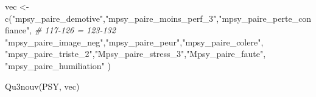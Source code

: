\documentclass[
]{article}
\newenvironment{Shaded}{\begin{snugshade}}{\end{snugshade}}
\newcommand{\CommentTok}[1]{\textcolor[rgb]{0.56,0.35,0.01}{\textit{#1}}}
\newcommand{\FunctionTok}[1]{\textcolor[rgb]{0.00,0.00,0.00}{#1}}
\newcommand{\NormalTok}[1]{#1}
\newcommand{\OtherTok}[1]{\textcolor[rgb]{0.56,0.35,0.01}{#1}}
\newcommand{\StringTok}[1]{\textcolor[rgb]{0.31,0.60,0.02}{#1}}
\begin{document}
\begin{Shaded}
\begin{Highlighting}[]
\NormalTok{vec }\OtherTok{\textless{}{-}} \FunctionTok{c}\NormalTok{(}\StringTok{"mpsy\_paire\_demotive"}\NormalTok{,}\StringTok{"mpsy\_paire\_moins\_perf\_3"}\NormalTok{,}\StringTok{"mpsy\_paire\_perte\_confiance"}\NormalTok{,  }\CommentTok{\# 117{-}126 = 123{-}132}
    \StringTok{"mpsy\_paire\_image\_neg"}\NormalTok{,}\StringTok{"mpsy\_paire\_peur"}\NormalTok{,}\StringTok{"mpsy\_paire\_colere"}\NormalTok{,}
    \StringTok{"mpsy\_paire\_triste\_2"}\NormalTok{,}\StringTok{"Mpsy\_paire\_stress\_3"}\NormalTok{,}\StringTok{"Mpsy\_paire\_faute"}\NormalTok{,}
    \StringTok{"mpsy\_paire\_humiliation"}
\NormalTok{     )}

\FunctionTok{Qu3nouv}\NormalTok{(PSY, vec)}
\end{Highlighting}
\end{Shaded}
\end{document}
